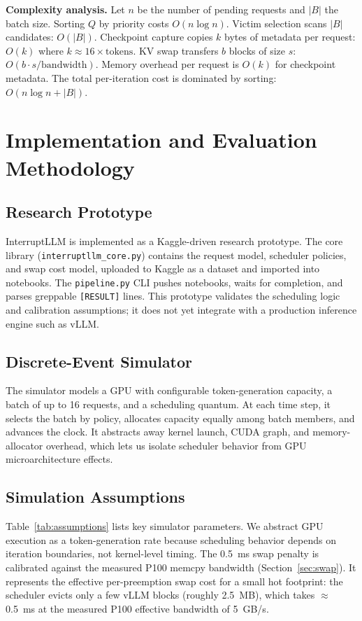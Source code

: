 \documentclass[conference]{IEEEtran}
\begin{document}
\textbf{Complexity analysis.} Let $n$ be the number of pending requests and $|B|$ the batch size. Sorting $Q$ by priority costs $O(n \log n)$. Victim selection scans $|B|$ candidates: $O(|B|)$. Checkpoint capture copies $k$ bytes of metadata per request: $O(k)$ where $k \approx 16 \times \text{tokens}$. KV swap transfers $b$ blocks of size $s$: $O(b \cdot s / \text{bandwidth})$. Memory overhead per request is $O(k)$ for checkpoint metadata. The total per-iteration cost is dominated by sorting: $O(n \log n + |B|)$.

\section{Implementation and Evaluation Methodology}\label{sec:eval}

\subsection{Research Prototype}

InterruptLLM is implemented as a Kaggle-driven research prototype. The core library (\texttt{interruptllm\_core.py}) contains the request model, scheduler policies, and swap cost model, uploaded to Kaggle as a dataset and imported into notebooks. The \texttt{pipeline.py} CLI pushes notebooks, waits for completion, and parses greppable \texttt{[RESULT]} lines. This prototype validates the scheduling logic and calibration assumptions; it does not yet integrate with a production inference engine such as vLLM.

\subsection{Discrete-Event Simulator}

The simulator models a GPU with configurable token-generation capacity, a batch of up to 16 requests, and a scheduling quantum. At each time step, it selects the batch by policy, allocates capacity equally among batch members, and advances the clock. It abstracts away kernel launch, CUDA graph, and memory-allocator overhead, which lets us isolate scheduler behavior from GPU microarchitecture effects.

\subsection{Simulation Assumptions}\label{sec:assumptions}

Table~\ref{tab:assumptions} lists key simulator parameters. We abstract GPU execution as a token-generation rate because scheduling behavior depends on iteration boundaries, not kernel-level timing. The 0.5~ms swap penalty is calibrated against the measured P100 memcpy bandwidth (Section~\ref{sec:swap}). It represents the effective per-preemption swap cost for a small hot footprint: the scheduler evicts only a few vLLM blocks (roughly 2.5~MB), which takes $\approx$0.5~ms at the measured P100 effective bandwidth of 5~GB/s.
\end{document}
